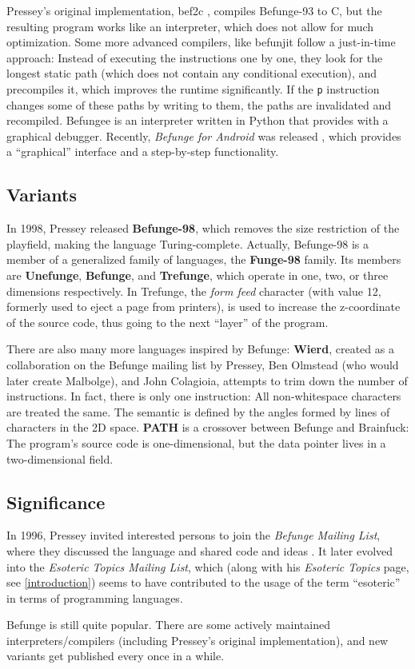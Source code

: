 Pressey's original implementation, bef2c \cite{pressey1993befunge}, compiles Befunge-93 to C, but the resulting program works like an interpreter, which does not allow for much optimization. Some more advanced compilers, like befunjit \cite{toncean_befunge} follow a just-in-time approach: Instead of executing the instructions one by one, they look for the longest static path (which does not contain any conditional execution), and precompiles it, which improves the runtime significantly. If the \texttt{p} instruction changes some of these paths by writing to them, the paths are invalidated and recompiled. Befungee \cite{mcenroe_befunge} is an interpreter written in Python that provides with a graphical debugger. Recently, \emph{Befunge for Android} was released \cite{alexander_befunge}, which provides a “graphical” interface and a step-by-step functionality.

\subsection{Variants}

In 1998, Pressey released \textbf{Befunge-98}, which removes the size restriction of the playfield, making the language Turing-complete. Actually, Befunge-98 is a member of a generalized family of languages, the \textbf{Funge-98} family. Its members are \textbf{Unefunge}, \textbf{Befunge}, and \textbf{Trefunge}, which operate in one, two, or three dimensions respectively. In Trefunge, the \emph{form feed} character (with \ascii{} value 12, formerly used to eject a page from printers), is used to increase the z-coordinate of the source code, thus going to the next “layer” of the program.

There are also many more languages inspired by Befunge: \textbf{Wierd}, created as a collaboration on the Befunge mailing list by Pressey, Ben Olmstead (who would later create Malbolge), and John Colagioia, attempts to trim down the number of instructions. In fact, there is only one instruction: All non-whitespace characters are treated the same. The semantic is defined by the angles formed by lines of characters in the 2D space. \textbf{PATH} is a crossover between Befunge and Brainfuck: The program's source code is one-dimensional, but the data pointer lives in a two-dimensional field.

\subsection{Significance}

In 1996, Pressey invited interested persons to join the \emph{Befunge Mailing List}, where they discussed the language and shared code and ideas \cite{pressey1996welcome}. It later evolved into the \emph{Esoteric Topics Mailing List}, which (along with his \emph{Esoteric Topics} page, see \cref{introduction}) seems to have contributed to the usage of the term “esoteric” in terms of programming languages.

Befunge is still quite popular. There are some actively maintained interpreters/compilers (including Pressey's original implementation), and new variants get published every once in a while.
